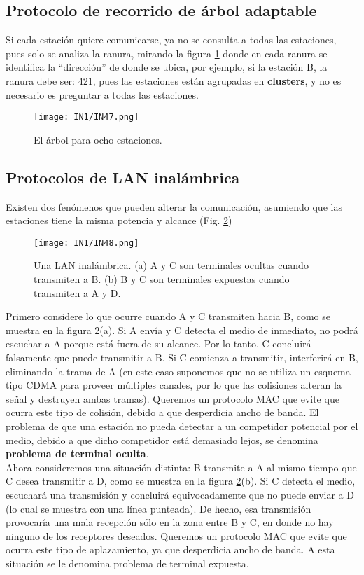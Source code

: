 \documentclass[
	12pt, %
	fleqn, %
	a4paper, %
	oneside, %
]{LegrandOrangeBook}
\begin{document}
\subsection{Protocolo de recorrido de árbol adaptable}
Si cada estación quiere comunicarse, ya no se consulta a todas las estaciones, pues solo se analiza la ranura, mirando la figura \ref{fig: arbol adaptativo} donde en cada ranura se identifica la ``dirección'' de donde se ubica, por ejemplo, si la estación B, la ranura debe ser: 421, pues las estaciones están agrupadas en \textbf{clusters}, y no es necesario es preguntar a todas las estaciones.
\begin{figure}[H]
\centering
\texttt{[image: IN1/IN47.png]}
\caption{El árbol para ocho estaciones.}
\label{fig: arbol adaptativo}
\end{figure}
\subsection{Protocolos de LAN inalámbrica}
Existen dos fenómenos que pueden alterar la comunicación, asumiendo que las estaciones tiene la misma potencia y alcance (Fig. \ref{fig:wireless lan})
\begin{figure}[]
\centering
\texttt{[image: IN1/IN48.png]}
\caption{Una LAN inalámbrica. (a) A y C son terminales ocultas cuando transmiten a B. (b) B y C son terminales expuestas cuando transmiten a A y D.}
\label{fig:wireless lan}
\end{figure}
Primero considere lo que ocurre cuando A y C transmiten hacia B, como se muestra en la figura \ref{fig:wireless lan}(a). Si A envía y C detecta el medio de inmediato, no podrá escuchar a A porque está fuera de su alcance. Por lo tanto, C concluirá falsamente que puede transmitir a B. Si C comienza a transmitir, interferirá en B, eliminando la trama de A (en este caso suponemos que no se utiliza un esquema tipo CDMA para proveer múltiples canales, por lo que las colisiones alteran la señal y destruyen ambas tramas). Queremos un protocolo MAC que evite que ocurra este tipo de colisión, debido a que desperdicia ancho de banda. El problema de que una estación no pueda detectar a un competidor potencial por el medio, debido a que dicho competidor está demasiado lejos, se denomina \textbf{problema de terminal oculta}.\\
Ahora consideremos una situación distinta: B transmite a A al mismo tiempo que C desea transmitir a D, como se muestra en la figura \ref{fig:wireless lan}(b). Si C detecta el medio, escuchará una transmisión y concluirá equivocadamente que no puede enviar a D (lo cual se muestra con una línea punteada). De hecho, esa transmisión provocaría una mala recepción sólo en la zona entre B y C, en donde no hay ninguno de los receptores deseados. Queremos un protocolo MAC que evite que ocurra este tipo de aplazamiento, ya que desperdicia ancho de banda. A esta situación se le denomina problema de terminal expuesta.\\
\end{document}
